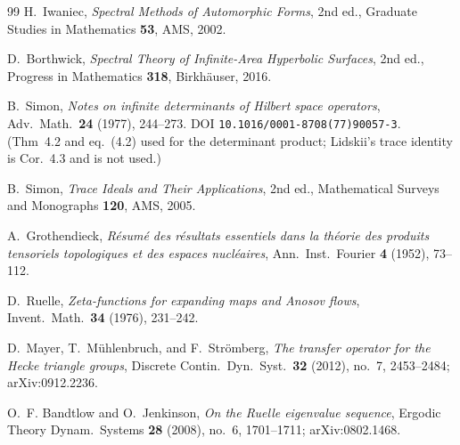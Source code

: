 \documentclass[11pt]{article}
\theoremstyle{definition}
\theoremstyle{remark}
\begin{document}
\begin{thebibliography}{99}
H.~Iwaniec,
\emph{Spectral Methods of Automorphic Forms},
2nd ed., Graduate Studies in Mathematics \textbf{53}, AMS, 2002.

D.~Borthwick,
\emph{Spectral Theory of Infinite-Area Hyperbolic Surfaces},
2nd ed., Progress in Mathematics \textbf{318}, Birkh\"auser, 2016. %

B.~Simon,
\emph{Notes on infinite determinants of Hilbert space operators},
Adv.\ Math.\ \textbf{24} (1977), 244--273.
DOI \texttt{10.1016/0001-8708(77)90057-3}. %
(Thm~4.2 and eq.~(4.2) used for the determinant product; Lidskii's
trace identity is Cor.~4.3 and is not used.) %

B.~Simon,
\emph{Trace Ideals and Their Applications},
2nd ed., Mathematical Surveys and Monographs \textbf{120}, AMS, 2005. %

A.~Grothendieck,
\emph{R\'esum\'e des r\'esultats essentiels dans la th\'eorie des
produits tensoriels topologiques et des espaces nucl\'eaires},
Ann.\ Inst.\ Fourier \textbf{4} (1952), 73--112.

D.~Ruelle,
\emph{Zeta-functions for expanding maps and Anosov flows},
Invent.\ Math.\ \textbf{34} (1976), 231--242.

D.~Mayer, T.~M\"uhlenbruch, and F.~Str\"omberg,
\emph{The transfer operator for the Hecke triangle groups},
Discrete Contin.\ Dyn.\ Syst.\ \textbf{32} (2012), no.~7, 2453--2484;
arXiv:0912.2236.

O.~F. Bandtlow and O.~Jenkinson,
\emph{On the Ruelle eigenvalue sequence},
Ergodic Theory Dynam.\ Systems \textbf{28} (2008), no.~6, 1701--1711;
arXiv:0802.1468. %


\end{thebibliography}
\end{document}
